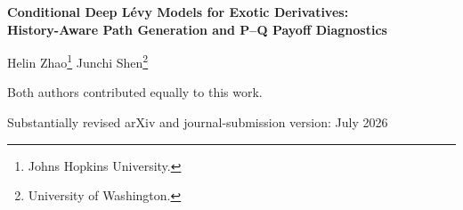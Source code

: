 ﻿\documentclass[12pt,letterpaper]{article}
\begin{document}

\begin{titlepage}
\begin{center}
\vspace*{0.35cm}
{\Large\bfseries Conditional Deep L\'evy Models for Exotic Derivatives:\\[5pt]
History-Aware Path Generation and P--Q Payoff Diagnostics\par}

\vspace{0.55cm}
{\large Helin Zhao\footnote{Johns Hopkins University.}
\qquad
Junchi Shen\footnote{University of Washington.}\par}

\vspace{0.15cm}
{\small Both authors contributed equally to this work.\par}

\vspace{0.25cm}
{Substantially revised arXiv and journal-submission version: July 2026\par}
\end{center}

\vspace{0.35cm}
\begin{abstract}
\noindent
We develop and audit a history-aware financial path generator based on
Denoising L\'evy Probabilistic Models (DLPMs) for conditional equity-index
path generation. The model combines symmetric
$\alpha$-stable diffusion noise with a conditional U-Net observing the
contract state, 60- and 252-day return histories, trend, drawdown, volatility
paths, country, and index identity. A chronological protocol evaluates a
frozen model on 6{,}824 untouched windows from eight Chinese and U.S. equity
indices. The final generator attains terminal CRPS 0.0485, path energy score
0.3368, a generated-to-realized volatility ratio of 0.882, and aggregate
signed terminal-median bias of $-0.46$ percentage points. It improves terminal
CRPS over contract-only DLPM and Gaussian diffusion controls, while an
unconditional historical block bootstrap remains competitive on pooled
marginal metrics. Against a stronger state-matched empirical control that
selects same-index, same-tenor training windows using pre-window volatility,
trend, and drawdown, DLPM lowers terminal CRPS from 0.0633 to 0.0485 (23.3\%);
for this state-matched CRPS comparison, joint calendar-block confidence
intervals remain below zero for block lengths
from 20 to 150 days.


\end{abstract}
\end{titlepage}
\end{document}
